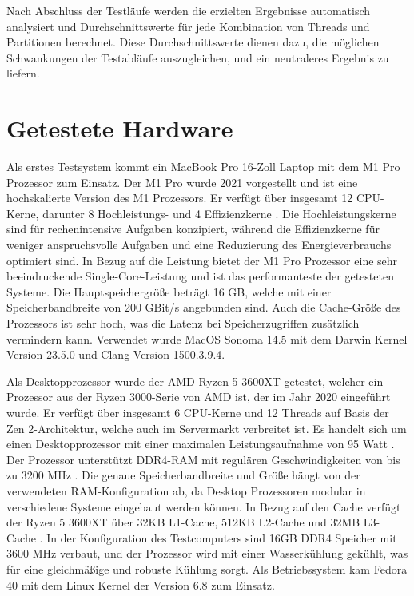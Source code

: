 Nach Abschluss der Testläufe werden die erzielten Ergebnisse automatisch analysiert und Durchschnittswerte für jede Kombination von Threads und Partitionen berechnet. Diese Durchschnittswerte dienen dazu, die möglichen Schwankungen der Testabläufe auszugleichen, und ein neutraleres Ergebnis zu liefern.

\section{Getestete Hardware}
\label{sec:tested_hardware}

Als erstes Testsystem kommt ein MacBook Pro 16-Zoll Laptop mit dem M1 Pro Prozessor zum Einsatz. Der M1 Pro wurde 2021 vorgestellt und ist eine hochskalierte Version des M1 Prozessors. Er verfügt über insgesamt 12 CPU-Kerne, darunter 8 Hochleistungs- und 4 Effizienzkerne \citep{MacBook_Technische_Daten}. Die Hochleistungskerne sind für rechenintensive Aufgaben konzipiert, während die Effizienzkerne für weniger anspruchsvolle Aufgaben und eine Reduzierung des Energieverbrauchs optimiert sind.
In Bezug auf die Leistung bietet der M1 Pro Prozessor eine sehr beeindruckende Single-Core-Leistung und ist das performanteste der getesteten Systeme. Die Hauptspeichergröße beträgt 16 GB, welche mit einer Speicherbandbreite von 200 GBit/s \citep{MacBook_Technische_Daten} angebunden sind. Auch die Cache-Größe des Prozessors ist sehr hoch, was die Latenz bei Speicherzugriffen zusätzlich vermindern kann.
Verwendet wurde MacOS Sonoma 14.5 mit dem Darwin Kernel Version 23.5.0 und Clang Version 1500.3.9.4.

Als Desktopprozessor wurde der AMD Ryzen 5 3600XT getestet, welcher ein Prozessor aus der Ryzen 3000-Serie von AMD ist, der im Jahr 2020 eingeführt wurde. Er verfügt über insgesamt 6 CPU-Kerne und 12 Threads auf Basis der Zen 2-Architektur, welche auch im Servermarkt verbreitet ist. Es handelt sich um einen Desktopprozessor mit einer maximalen Leistungsaufnahme von 95 Watt \citep{Ryzen_Technische_Daten}.
Der Prozessor unterstützt DDR4-RAM mit regulären Geschwindigkeiten von bis zu 3200 MHz \citep{Ryzen_Technische_Daten}. Die genaue Speicherbandbreite und Größe hängt von der verwendeten RAM-Konfiguration ab, da Desktop Prozessoren modular in verschiedene Systeme eingebaut werden können.
In Bezug auf den Cache verfügt der Ryzen 5 3600XT über 32KB L1-Cache, 512KB L2-Cache und 32MB L3-Cache \citep{Ryzen_Technische_Daten}. In der Konfiguration des Testcomputers sind 16GB DDR4 Speicher mit 3600 MHz verbaut, und der Prozessor wird mit einer Wasserkühlung gekühlt, was für eine gleichmäßige und robuste Kühlung sorgt. Als Betriebssystem kam Fedora 40 mit dem Linux Kernel der Version 6.8 zum Einsatz.

